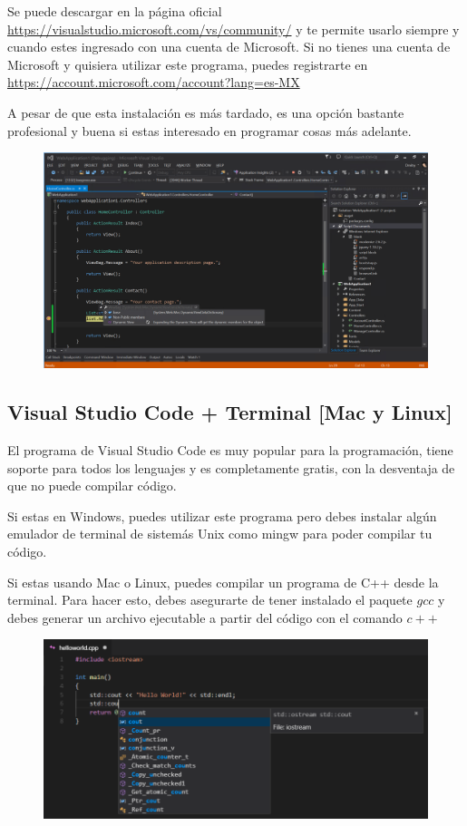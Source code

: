 \documentclass{article}
\begin{document}
Se puede descargar en la página oficial \url{https://visualstudio.microsoft.com/vs/community/} y te permite usarlo siempre y cuando estes ingresado con una cuenta de Microsoft. Si no tienes una cuenta de Microsoft y quisiera utilizar este programa, puedes registrarte en \url{https://account.microsoft.com/account?lang=es-MX}

A pesar de que esta instalación es más tardado, es una opción bastante profesional y buena si estas interesado en programar cosas más adelante.

\begin{figure}[H]
    \centering
    \includegraphics[width=0.5\paperwidth]{vscommunity}
\end{figure}

\subsection{Visual Studio Code + Terminal [Mac y Linux]}
El programa de Visual Studio Code es muy popular para la programación, tiene soporte para todos los lenguajes y es completamente gratis, con la desventaja de que no puede compilar código.

Si estas en Windows, puedes utilizar este programa pero debes instalar algún emulador de terminal de sistemás Unix como mingw para poder compilar tu código.

Si estas usando Mac o Linux, puedes compilar un programa de C++ desde la terminal. Para hacer esto, debes asegurarte de tener instalado el paquete $gcc$ y debes generar un archivo ejecutable a partir del código con el comando $c++$

\begin{figure}[H]
    \centering
    \includegraphics[width=0.5\paperwidth]{vscode}
\end{figure}
\end{document}
